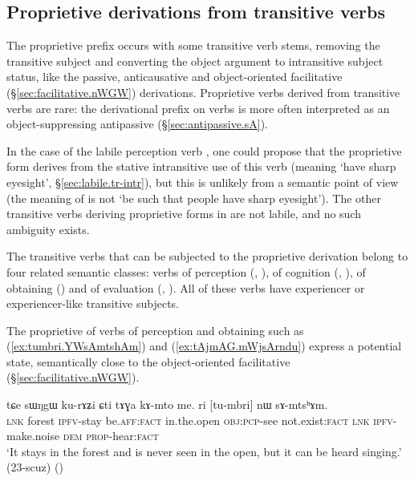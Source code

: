 \subsection{Proprietive derivations from transitive verbs} \label{sec:proprietive.tr}
The proprietive prefix occurs with some transitive verb stems, removing the transitive subject and converting the object  argument to intransitive subject status, like the passive, anticausative and object-oriented facilitative (§\ref{sec:facilitative.nWGW}) derivations. Proprietive verbs derived from transitive verbs are rare: the derivational  prefix on verbs is more often interpreted as an object-suppressing antipassive (§\ref{sec:antipassive.sA}).

In the case of the labile perception verb , one could propose that the proprietive form  derives from the stative intransitive use of this verb (meaning `have sharp eyesight', §\ref{sec:labile.tr-intr}), but this is unlikely from a semantic point of view (the meaning of  is not `be such that people have sharp eyesight'). The other transitive verbs deriving proprietive forms in  are not labile, and no such ambiguity exists.

The transitive verbs that can be subjected to the proprietive derivation belong to four related semantic classes: verbs of perception (, ), of cognition (, ), of obtaining () and of evaluation (, ). All of these verbs have experiencer or experiencer-like transitive subjects.

The proprietive of verbs of perception and obtaining such as  (\ref{ex:tumbri.YWsAmtshAm}) and  (\ref{ex:tAjmAG.mWjsArndu}) express a potential state, semantically close to the object-oriented facilitative (§\ref{sec:facilitative.nWGW}).

\begin{exe}
\ex \label{ex:tumbri.YWsAmtshAm}
\gll tɕe sɯŋgɯ ku-rɤʑi ɕti tɤɣa kɤ-mto me. ri [tu-mbri] nɯ sɤ-mtsʰɤm.\\
\textsc{lnk} forest \textsc{ipfv}-stay be.\textsc{aff}:\textsc{fact} in.the.open \textsc{obj}:\textsc{pcp}-see not.exist:\textsc{fact} \textsc{lnk} \textsc{ipfv}-make.noise \textsc{dem} \textsc{prop}-hear:\textsc{fact} \\
\glt `It stays in the forest and is never seen in the open, but it can be heard singing.' (23-scuz)
()
\end{exe}

